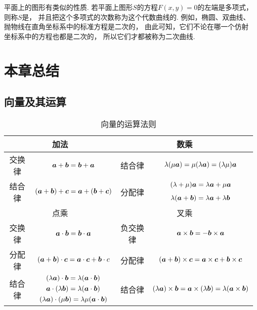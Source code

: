 平面上的图形有类似的性质.
若平面上图形\(S\)的方程\(F(x,y)=0\)的左端是多项式，
则称\(S\)是，
并且把这个多项式的次数称为这个代数曲线的.
例如，椭圆、双曲线、抛物线在直角坐标系中的标准方程是二次的，
由此可知，它们不论在哪一个仿射坐标系中的方程也都是二次的，
所以它们才都被称为二次曲线.


\section{本章总结}
\subsection*{向量及其运算}
\begin{table}[ht]
	\centering
	\begin{tabular}{|c|c|c|c|}
	\hline
	\multicolumn{2}{|c|}{加法} & \multicolumn{2}{c|}{数乘} \\ \hline
	交换律 & \(\boldsymbol{a}+\boldsymbol{b}=\boldsymbol{b}+\boldsymbol{a}\) &
		结合律 & \(\lambda(\mu\boldsymbol{a})=\mu(\lambda\boldsymbol{a})=(\lambda\mu)\boldsymbol{a}\) \\ \hline
	\multirow{2}{*}{结合律} & \multirow{2}{*}{\((\boldsymbol{a}+\boldsymbol{b})+\boldsymbol{c}=\boldsymbol{a}+(\boldsymbol{b}+\boldsymbol{c})\)} &
		\multirow{2}{*}{分配律} & \((\lambda+\mu)\boldsymbol{a}=\lambda\boldsymbol{a}+\mu\boldsymbol{a}\) \\
	 & & & \(\lambda(\boldsymbol{a}+\boldsymbol{b})=\lambda\boldsymbol{a}+\lambda\boldsymbol{b}\) \\ \hline
	\multicolumn{2}{|c|}{点乘} & \multicolumn{2}{c|}{叉乘} \\ \hline
	交换律 & \(\boldsymbol{a}\cdot\boldsymbol{b}=\boldsymbol{b}\cdot\boldsymbol{a}\) &
		负交换律 & \(\boldsymbol{a}\times\boldsymbol{b}=-\boldsymbol{b}\times\boldsymbol{a}\) \\ \hline
	分配律 & \((\boldsymbol{a}+\boldsymbol{b})\cdot\boldsymbol{c}=\boldsymbol{a}\cdot\boldsymbol{c}+\boldsymbol{b}\cdot{c}\) &
		分配律 & \((\boldsymbol{a}+\boldsymbol{b})\times\boldsymbol{c}=\boldsymbol{a}\times\boldsymbol{c}+\boldsymbol{b}\times\boldsymbol{c}\) \\ \hline
	\multirow{3}{*}{结合律} & \((\lambda\boldsymbol{a})\cdot\boldsymbol{b}=\lambda(\boldsymbol{a}\cdot\boldsymbol{b})\) & \multirow{3}{*}{结合律} & \multirow{3}{*}{\((\lambda\boldsymbol{a})\times\boldsymbol{b}=\boldsymbol{a}\times(\lambda\boldsymbol{b})=\lambda(\boldsymbol{a}\times\boldsymbol{b})\)} \\
		& \(\boldsymbol{a}\cdot(\lambda\boldsymbol{b})=\lambda(\boldsymbol{a}\cdot\boldsymbol{b})\) & & \\
		& \((\lambda\boldsymbol{a})\cdot(\mu\boldsymbol{b})=\lambda\mu(\boldsymbol{a}\cdot\boldsymbol{b})\) & & \\
	\hline
	\end{tabular}
	\caption{向量的运算法则}
\end{table}


